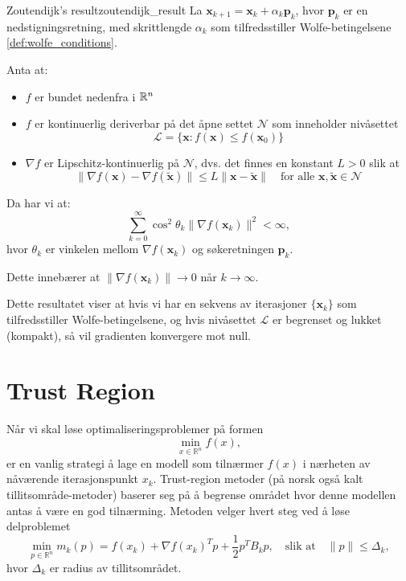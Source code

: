 \begin{theorem}{Zoutendijk's result}{zoutendijk_result}
	La \( \symbf{x}_{k+1} = \symbf{x}_k + \alpha_k \symbf{p}_k \), hvor \( \mathbf{p}_k \) er en nedstigningsretning, med skrittlengde \( \alpha_k \) som tilfredsstiller Wolfe-betingelsene \ref{def:wolfe_conditions}.

	Anta at:
	\begin{itemize}
		\item \(f\) er bundet nedenfra i \(\mathbb{R}^n\)
		\item \(f\) er kontinuerlig deriverbar på det åpne settet \(\mathcal{N}\) som inneholder nivåsettet
		      \[ \mathcal{L} = \{\symbf{x}: f(\symbf{x}) \leq f(\symbf{x}_0)\} \]
		\item \(\nabla f\) er Lipschitz-kontinuerlig på \(\mathcal{N}\), dvs. det finnes en konstant \(L > 0\) slik at
		      \[ \|\nabla f(\symbf{x}) - \nabla f(\tilde{\symbf{x}})\| \leq L\|\symbf{x} - \tilde{\symbf{x}}\| \quad \text{for alle } \symbf{x}, \tilde{\symbf{x}} \in \mathcal{N} \]
	\end{itemize}

	Da har vi at:
	\[
		\sum_{k=0}^{\infty} \cos^2 \theta_k \| \nabla f(\symbf{x}_k) \|^2 < \infty,
	\]
	hvor \( \theta_k \) er vinkelen mellom \( \nabla f(\symbf{x}_k) \) og søkeretningen \( \symbf{p}_k \).

	Dette innebærer at \( \| \nabla f(\symbf{x}_k) \| \to 0 \) når \( k \to \infty \).

	\medskip

	Dette resultatet viser at hvis vi har en sekvens av iterasjoner \( \{ \symbf{x}_k \} \) som tilfredsstiller Wolfe-betingelsene, og hvis nivåsettet \( \mathcal{L} \) er begrenset og lukket (kompakt), så vil gradienten konvergere mot null.

\end{theorem}



\section{Trust Region}
\label{sec:trust_region}
Når vi skal løse optimaliseringsproblemer på formen
\[ \min_{x \in \mathbb{R}^n} f(x), \]
er en vanlig strategi å lage en modell som tilnærmer $f(x)$ i nærheten av nåværende iterasjonspunkt $x_k$. 
Trust-region metoder (på norsk også kalt tillitsområde-metoder) baserer seg på å begrense området hvor denne modellen antas å være en god tilnærming.
Metoden velger hvert steg ved å løse delproblemet
\[
	\min_{p \in \mathbb{R}^n} m_k(p) = f(x_k) + \nabla f(x_k)^T p + \frac{1}{2} p^T B_k p, \quad \text{slik at} \quad \|p\| \le \Delta_k,
\]
hvor $\Delta_k$ er radius av tillitsområdet.



